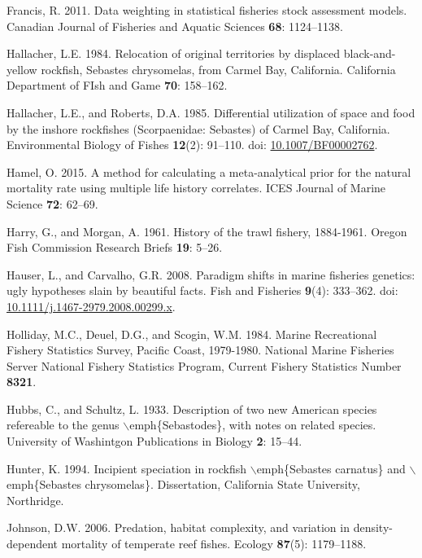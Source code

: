 \documentclass[12pt,]{article}
\begin{document}
\hypertarget{ref-Francis2011}{}
Francis, R. 2011. Data weighting in statistical fisheries stock
assessment models. Canadian Journal of Fisheries and Aquatic Sciences
\textbf{68}: 1124--1138.

\hypertarget{ref-Hallacher1984}{}
Hallacher, L.E. 1984. Relocation of original territories by displaced
black-and-yellow rockfish, Sebastes chrysomelas, from Carmel Bay,
California. California Department of FIsh and Game \textbf{70}:
158--162.

\hypertarget{ref-Hallacher1985}{}
Hallacher, L.E., and Roberts, D.A. 1985. Differential utilization of
space and food by the inshore rockfishes (Scorpaenidae: Sebastes) of
Carmel Bay, California. Environmental Biology of Fishes \textbf{12}(2):
91--110. doi:
\href{https://doi.org/10.1007/BF00002762}{10.1007/BF00002762}.

\hypertarget{ref-Hamel2015}{}
Hamel, O. 2015. A method for calculating a meta-analytical prior for the
natural mortality rate using multiple life history correlates. ICES
Journal of Marine Science \textbf{72}: 62--69.

\hypertarget{ref-Harry1961}{}
Harry, G., and Morgan, A. 1961. History of the trawl fishery, 1884-1961.
Oregon Fish Commission Research Briefs \textbf{19}: 5--26.

\hypertarget{ref-Hauser2008}{}
Hauser, L., and Carvalho, G.R. 2008. Paradigm shifts in marine fisheries
genetics: ugly hypotheses slain by beautiful facts. Fish and Fisheries
\textbf{9}(4): 333--362. doi:
\href{https://doi.org/10.1111/j.1467-2979.2008.00299.x}{10.1111/j.1467-2979.2008.00299.x}.

\hypertarget{ref-Holliday1984}{}
Holliday, M.C., Deuel, D.G., and Scogin, W.M. 1984. Marine Recreational
Fishery Statistics Survey, Pacific Coast, 1979-1980. National Marine
Fisheries Server National Fishery Statistics Program, Current Fishery
Statistics Number \textbf{8321}.

\hypertarget{ref-Hubbs1933}{}
Hubbs, C., and Schultz, L. 1933. Description of two new American species
refereable to the genus \(\backslash\)emph\{Sebastodes\}, with notes on
related species. University of Washintgon Publications in Biology
\textbf{2}: 15--44.

\hypertarget{ref-Hunter1994}{}
Hunter, K. 1994. Incipient speciation in rockfish
\(\backslash\)emph\{Sebastes carnatus\} and \(\backslash\)emph\{Sebastes
chrysomelas\}. Dissertation, California State University, Northridge.

\hypertarget{ref-Johnson2006}{}
Johnson, D.W. 2006. Predation, habitat complexity, and variation in
density-dependent mortality of temperate reef fishes. Ecology
\textbf{87}(5): 1179--1188.
\end{document}
